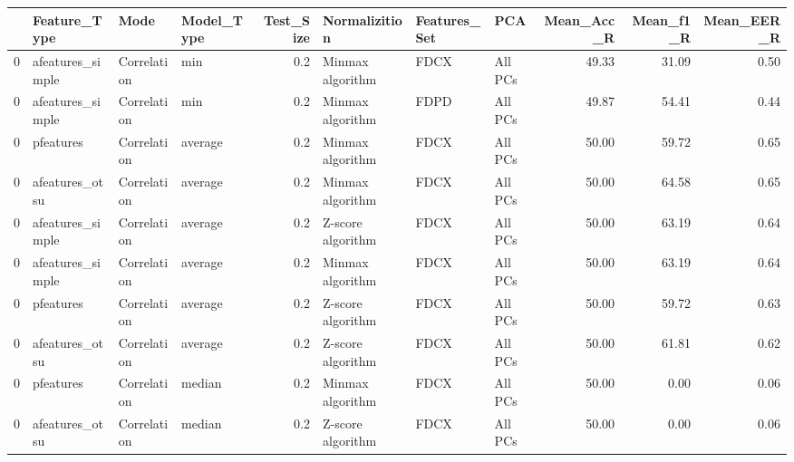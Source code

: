 \begin{tabular}{llllrlllrrr}
\toprule
{} &      Feature\_Type &         Mode & Model\_Type &  Test\_Size &      Normalizition & Features\_Set &      PCA &  Mean\_Acc\_R &  Mean\_f1\_R &  Mean\_EER\_R \\
\midrule
0 &  afeatures\_simple &  Correlation &        min &        0.2 &   Minmax algorithm &         FDCX &  All PCs &       49.33 &      31.09 &        0.50 \\
0 &  afeatures\_simple &  Correlation &        min &        0.2 &   Minmax algorithm &         FDPD &  All PCs &       49.87 &      54.41 &        0.44 \\
0 &         pfeatures &  Correlation &    average &        0.2 &   Minmax algorithm &         FDCX &  All PCs &       50.00 &      59.72 &        0.65 \\
0 &    afeatures\_otsu &  Correlation &    average &        0.2 &   Minmax algorithm &         FDCX &  All PCs &       50.00 &      64.58 &        0.65 \\
0 &  afeatures\_simple &  Correlation &    average &        0.2 &  Z-score algorithm &         FDCX &  All PCs &       50.00 &      63.19 &        0.64 \\
0 &  afeatures\_simple &  Correlation &    average &        0.2 &   Minmax algorithm &         FDCX &  All PCs &       50.00 &      63.19 &        0.64 \\
0 &         pfeatures &  Correlation &    average &        0.2 &  Z-score algorithm &         FDCX &  All PCs &       50.00 &      59.72 &        0.63 \\
0 &    afeatures\_otsu &  Correlation &    average &        0.2 &  Z-score algorithm &         FDCX &  All PCs &       50.00 &      61.81 &        0.62 \\
0 &         pfeatures &  Correlation &     median &        0.2 &   Minmax algorithm &         FDCX &  All PCs &       50.00 &       0.00 &        0.06 \\
0 &    afeatures\_otsu &  Correlation &     median &        0.2 &  Z-score algorithm &         FDCX &  All PCs &       50.00 &       0.00 &        0.06 \\
\bottomrule
\end{tabular}
